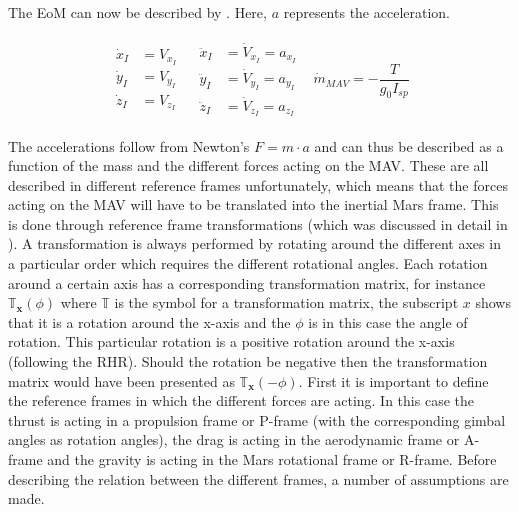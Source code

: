 
The \ac{EoM} can now be described by . Here, $a$ represents the acceleration.

\begin{align} \label{eq:cart_eom_mav}
\begin{split} 
\dot{x}_{I}&=V_{x_{I}}\\
\dot{y}_{I}&=V_{y_{I}}\\
\dot{z}_{I}&=V_{z_{I}}
\end{split} 
&
\begin{split}
\ddot{x}_{I}&=\dot{V}_{x_{I}}=a_{x_{I}}\\
\ddot{y}_{I}&=\dot{V}_{y_{I}}=a_{y_{I}}\\
\ddot{z}_{I}&=\dot{V}_{z_{I}}=a_{z_{I}}
\end{split}
&
\dot{m}_{MAV}=-\dfrac{T}{g_{0}I_{sp}}
\end{align}



The accelerations follow from Newton's $F=m \cdot a$ and can thus be described as a function of the mass and the different forces acting on the \ac{MAV}. These are all described in different reference frames unfortunately, which means that the forces acting on the \ac{MAV} will have to be translated into the inertial Mars frame. This is done through reference frame transformations (which was discussed in detail in ). A transformation is always performed by rotating around the different axes in a particular order which requires the different rotational angles. Each rotation around a certain axis has a corresponding transformation matrix, for instance $\mathbb{T}_{\mathbf{x}}(\phi)$ where $\mathbb{T}$ is the symbol for a transformation matrix, the subscript $x$ shows that it is a rotation around the x-axis and the $\phi$ is in this case the angle of rotation. This particular rotation is a positive rotation around the x-axis (following the \ac{RHR}). Should the rotation be negative then the transformation matrix would have been presented as $\mathbb{T}_{\mathbf{x}}(-\phi)$. First it is important to define the reference frames in which the different forces are acting. In this case the thrust is acting in a propulsion frame or P-frame (with the corresponding gimbal angles as rotation angles), the drag is acting in the aerodynamic frame or A-frame and the gravity is acting in the Mars rotational frame or R-frame. Before describing the relation between the different frames, a number of assumptions are made.

